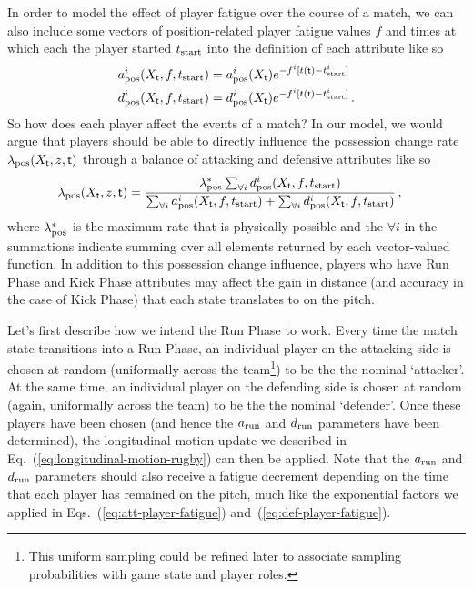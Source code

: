 In order to model the effect of player fatigue over the course of a match, we can also include some vectors of position-related player fatigue values $f$ and times at which each the player started $t_{\rm start}$ into the definition of each attribute like so
\begin{align}
a^i_{\rm pos}(X_{\sf t}, f, t_{\rm start}) &= a^i_{\rm pos}(X_{\sf t})e^{-f^i[t({\sf t})-t^i_{\rm start}]} \label{eq:att-player-fatigue} \\
d^i_{\rm pos}(X_{\sf t}, f, t_{\rm start}) &= d^i_{\rm pos}(X_{\sf t})e^{-f^i[t({\sf t})-t^i_{\rm start}]} \label{eq:def-player-fatigue} \,.
\end{align}
So how does each player affect the events of a match? In our model, we would argue that players should be able to directly influence the possession change rate $\lambda_{\rm pos}(X_{\sf t}, z, {\sf t})$ through a balance of attacking and defensive attributes like so
\begin{align}
\lambda_{\rm pos}(X_{\sf t}, z, {\sf t}) &= \frac{\lambda^*_{\rm pos}\sum_{\forall i}d^i_{\rm pos}(X_{\sf t}, f, t_{\rm start})}{\sum_{\forall i}a^i_{\rm pos}(X_{\sf t}, f, t_{\rm start}) + \sum_{\forall i}d^i_{\rm pos}(X_{\sf t}, f, t_{\rm start})}\,,
\end{align}
where $\lambda^*_{\rm pos}$ is the maximum rate that is physically possible and the $\forall i$ in the summations indicate summing over all elements returned by each vector-valued function. In addition to this possession change influence, players who have {\sf Run Phase} and {\sf Kick Phase} attributes may affect the gain in distance (and accuracy in the case of {\sf Kick Phase}) that each state translates to on the pitch. 

Let's first describe how we intend the {\sf Run Phase} to work. Every time the match state transitions into a {\sf Run Phase}, an individual player on the attacking side is chosen at random (uniformally across the team\footnote{This uniform sampling could be refined later to associate sampling probabilities with game state and player roles.}) to be the the nominal `attacker'. At the same time, an individual player on the defending side is chosen at random (again, uniformally across the team) to be the the nominal `defender'. Once these players have been chosen (and hence the $a_{\rm run}$ and $d_{\rm run}$ parameters have been determined), the longitudinal motion update we described in Eq.~(\ref{eq:longitudinal-motion-rugby}) can then be applied. Note that the $a_{\rm run}$ and $d_{\rm run}$ parameters should also receive a fatigue decrement depending on the time that each player has remained on the pitch, much like the exponential factors we applied in Eqs.~(\ref{eq:att-player-fatigue}) and~(\ref{eq:def-player-fatigue}).

